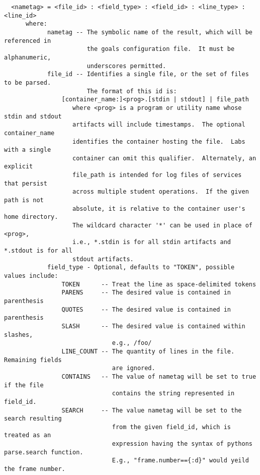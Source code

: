 \documentclass[12pt]{article}
\begin{document}
\begin{verbatim}
  <nametag> = <file_id> : <field_type> : <field_id> : <line_type> : <line_id>
      where:
            nametag -- The symbolic name of the result, which will be referenced in 
                       the goals configuration file.  It must be alphanumeric, 
                       underscores permitted.
            file_id -- Identifies a single file, or the set of files to be parsed.  
                       The format of this id is:
                [container_name:]<prog>.[stdin | stdout] | file_path
                   where <prog> is a program or utility name whose stdin and stdout 
                   artifacts will include timestamps.  The optional container_name 
                   identifies the container hosting the file.  Labs with a single 
                   container can omit this qualifier.  Alternately, an explicit 
                   file_path is intended for log files of services that persist 
                   across multiple student operations.  If the given path is not 
                   absolute, it is relative to the container user's home directory. 
                   The wildcard character '*' can be used in place of <prog>,
                   i.e., *.stdin is for all stdin artifacts and *.stdout is for all 
                   stdout artifacts.
            field_type - Optional, defaults to "TOKEN", possible values include:
                TOKEN      -- Treat the line as space-delimited tokens
                PARENS     -- The desired value is contained in parenthesis
                QUOTES     -- The desired value is contained in parenthesis
                SLASH      -- The desired value is contained within slashes, 
                              e.g., /foo/
                LINE_COUNT -- The quantity of lines in the file. Remaining fields 
                              are ignored.
                CONTAINS   -- The value of nametag will be set to true if the file 
                              contains the string represented in field_id.
                SEARCH     -- The value nametag will be set to the search resulting
                              from the given field_id, which is treated as an
                              expression having the syntax of pythons parse.search function.
                              E.g., "frame.number=={:d}" would yeild the frame number.
                              

\end{verbatim}
\end{document}
